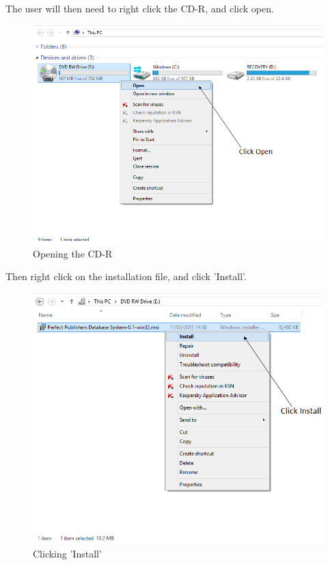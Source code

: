 The user will then need to right click the CD-R, and click open.

\begin{figure}[H]
    \includegraphics[width=\textwidth]{./Manual/Installation/OpenCDR.png}
    \caption{Opening the CD-R}
\end{figure}

Then right click on the installation file, and click 'Install'.

\begin{figure}[H]
    \includegraphics[width=\textwidth]{./Manual/Installation/Install.png}
    \caption{Clicking 'Install'}
\end{figure}

